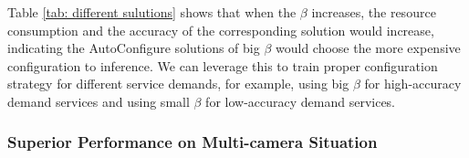 \begin{table}[!t]
	\centering
	\caption{Resource consumption and F1 accuracy for different AutoConfigure solutions}
	\label{tab: different sulutions}
\end{table}

Table \ref{tab: different sulutions} shows that when the $\beta$ increases, the resource consumption and the accuracy of the corresponding solution would increase, indicating the AutoConfigure solutions of big $\beta$ would choose the more expensive configuration to inference. We can leverage this to train proper configuration strategy for different service demands, for example, using big $\beta$ for high-accuracy demand services and using small $\beta$ for low-accuracy demand services.  

\subsubsection{Superior Performance on Multi-camera Situation}
\label{subsec: superior performance}

